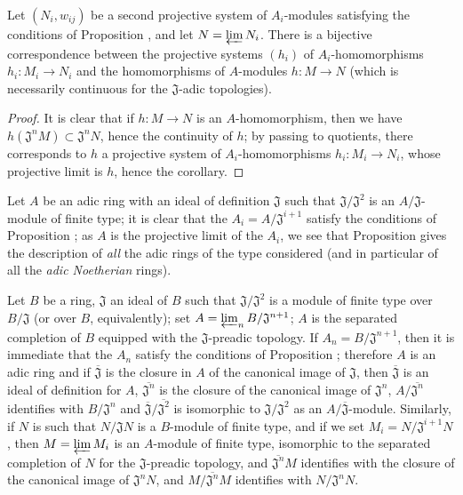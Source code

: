 \begin{corollary}[7.2.10]
\label{0.7.2.10}
Let $(N_i,w_{ij})$ be a second projective system of $A_i$-modules satisfying the conditions
of Proposition , and let $N=\varprojlim N_i$. There is a
bijective correspondence between the projective systems $(h_i)$ of $A_i$-homomorphisms
$h_i:M_i\to N_i$ and the homomorphisms of $A$-modules $h:M\to N$ (which is necessarily
continuous for the $\mathfrak{J}$-adic topologies).
\end{corollary}

\begin{proof}
It is clear that if $h:M\to N$ is an $A$-homomorphism, then we have
$h(\mathfrak{J}^n M)\subset\mathfrak{J}^n N$, hence the continuity of $h$; by passing to
quotients, there corresponds to $h$ a projective system of $A_i$-homomorphisms
$h_i:M_i\to N_i$, whose projective limit is $h$, hence the corollary.
\end{proof}

\begin{remark}[7.2.11]
\label{0.7.2.11}
Let $A$ be an adic ring with an ideal of definition $\mathfrak{J}$ such that
$\mathfrak{J}/\mathfrak{J}^2$ is an $A/\mathfrak{J}$-module of finite type; it is clear
that the $A_i=A/\mathfrak{J}^{i+1}$ satisfy
the conditions of Proposition ; as $A$ is the projective
limit of the $A_i$, we see that Proposition  gives the
description of \emph{all} the adic rings of the type considered (and in particular of all
the \emph{adic Noetherian} rings).
\end{remark}

\begin{example}[7.2.12]
\label{0.7.2.12}
Let $B$ be a ring, $\mathfrak{J}$ an ideal of $B$ such that $\mathfrak{J}/\mathfrak{J}^2$ is
a module of finite type over $B/\mathfrak{J}$ (or over $B$, equivalently); set
$A=\varprojlim_n B/\mathfrak{J}^{n+1}$; $A$ is the separated completion of $B$ equipped with
the $\mathfrak{J}$-preadic topology. If $A_n=B/\mathfrak{J}^{n+1}$, then it is immediate
that the $A_n$ satisfy the conditions of Proposition ;
therefore $A$ is an adic ring and if $\overline{\mathfrak{J}}$ is the closure in $A$ of the
canonical image of $\mathfrak{J}$, then $\overline{\mathfrak{J}}$ is an ideal of definition
for $A$, $\overline{\mathfrak{J}^n}$ is the closure of the canonical image of
$\mathfrak{J}^n$, $A/\overline{\mathfrak{J}^n}$ identifies with $B/\mathfrak{J}^n$ and
$\overline{\mathfrak{J}}/\overline{\mathfrak{J}^2}$ is isomorphic to
$\mathfrak{J}/\mathfrak{J}^2$ as an $A/\overline{\mathfrak{J}}$-module. Similarly, if $N$
is such that $N/\mathfrak{J}N$ is a $B$-module of finite type, and if we set
$M_i=N/\mathfrak{J}^{i+1}N$, then $M=\varprojlim M_i$ is an $A$-module of finite type,
isomorphic to the separated completion of $N$ for the $\mathfrak{J}$-preadic topology, and
$\overline{\mathfrak{J}^n}M$ identifies with the closure of the canonical image of
$\mathfrak{J}^n N$, and $M/\overline{\mathfrak{J}^n}M$ identifies with
$N/\mathfrak{J}^n N$.
\end{example}

